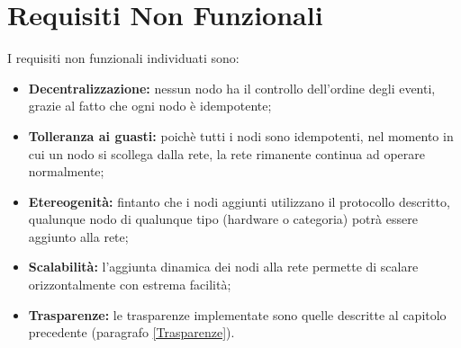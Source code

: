\documentclass{memoir}
\begin{document}
\section{Requisiti Non Funzionali}

I requisiti non funzionali individuati sono:
\begin{itemize}
\item \textbf{Decentralizzazione:} nessun nodo ha il controllo dell'ordine degli eventi, grazie al fatto che ogni nodo è idempotente;
\item \textbf{Tolleranza ai guasti:} poichè tutti i nodi sono idempotenti, nel momento in cui un nodo si scollega dalla rete, la rete rimanente continua ad operare normalmente;
\item \textbf{Etereogenità:} fintanto che i nodi aggiunti utilizzano il protocollo descritto, qualunque nodo di qualunque tipo (hardware o categoria) potrà essere aggiunto alla rete;
\item \textbf{Scalabilità:} l'aggiunta dinamica dei nodi alla rete permette di scalare orizzontalmente con estrema facilità;
\item \textbf{Trasparenze:} le trasparenze implementate sono quelle descritte al capitolo precedente (paragrafo \ref{Trasparenze}).
\end{itemize}

%
%
%
%
%
\end{document}
